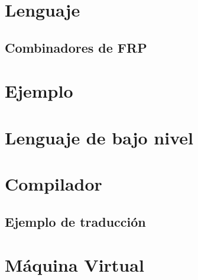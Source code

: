 


\section{Lenguaje \frob{}}


\subsection{Combinadores de FRP}


\section{Ejemplo}


\section{Lenguaje de bajo nivel}


\section{Compilador}

\subsection{Ejemplo de traducción}


\section{Máquina Virtual}


